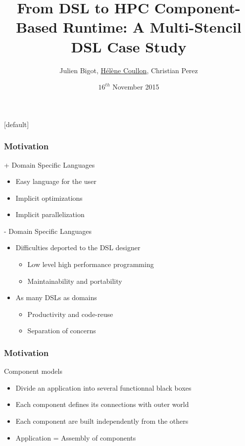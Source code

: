 \documentclass{beamer}
\title[From DSL to HPC Component-Based Runtime: A Multi-Stencil DSL Case Study]{From DSL to HPC Component-Based Runtime: A Multi-Stencil DSL Case Study}
\author[Julien Bigot (CEA), Hélène Coullon (INRIA), Christian Perez (INRIA)]{Julien Bigot, \underline{Hélène Coullon}, Christian Perez}
\institute[INRIA]{INRIA team Avalon\\Maison de la simulation (CEA)}
\date{$16^{th}$ November 2015}
\makeatletter
\newenvironment{withoutheadline}{
        \setbeamertemplate{headline}[default]
        \def\beamer@entrycode{\vspace*{-\headheight}}
    }{}
\makeatother
\begin{document}
\begin{withoutheadline}

\begin{frame}
    \titlepage
\end{frame}

\begin{frame}
\frametitle{Motivation} %
\begin{block}{+ Domain Specific Languages}
\begin{itemize}
\item Easy language for the user
\item Implicit optimizations
\item Implicit parallelization
\end{itemize}
\end{block}
\begin{alertblock}{- Domain Specific Languages}
\begin{itemize}
\item Difficulties deported to the DSL designer
\begin{itemize}
\item Low level high performance programming
\item Maintainability and portability
\end{itemize}
\item As many DSLs as domains
\begin{itemize}
\item Productivity and code-reuse
\item Separation of concerns
\end{itemize}
\end{itemize}
\end{alertblock}
\end{frame}
\begin{frame}
\frametitle{Motivation} %
\begin{block}{Component models}
\begin{itemize}
\item Divide an application into several functionnal black boxes
\item Each component defines its connections with outer world
\item Each component are built independently from the others
\item Application = Assembly of components

\end{itemize}
\end{block}
\end{frame}
\end{withoutheadline}
\end{document}
